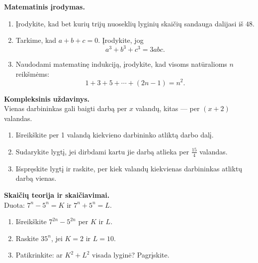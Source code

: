 \begin{exercise}
\textbf{Matematinis įrodymas.}
\begin{enumerate}[label=\arabic*.]
  \item Įrodykite, kad bet kurių trijų nuoseklių lyginių skaičių sandauga
        dalijasi iš $48$.
  \item Tarkime, kad $a + b + c = 0$. Įrodykite, jog
  \[
    a^3 + b^3 + c^3 = 3abc.
  \]
  \item Naudodami matematinę indukciją, įrodykite, kad visoms natūralioms
        $n$ reikšmėms:
  \[
    1 + 3 + 5 + \cdots + (2n-1) = n^2.
  \]
\end{enumerate}
\end{exercise}

\begin{exercise}
\textbf{Kompleksinis uždavinys.}\\
Vienas darbininkas gali baigti darbą per $x$ valandų, kitas — per $(x + 2)$
valandas.
\begin{enumerate}[label=\arabic*.]
  \item Išreikškite per 1 valandą kiekvieno darbininko atliktą darbo dalį.
  \item Sudarykite lygtį, jei dirbdami kartu jie darbą atlieka per $\frac{15}{4}$
        valandas.
  \item Išspręskite lygtį ir raskite, per kiek valandų kiekvienas darbininkas
        atliktų darbą vienas.
\end{enumerate}
\end{exercise}

\begin{exercise}
\textbf{Skaičių teorija ir skaičiavimai.}\\
Duota: $7^n - 5^n = K$ ir $7^n + 5^n = L$.
\begin{enumerate}[label=\arabic*.]
  \item Išreikškite $7^{2n} - 5^{2n}$ per $K$ ir $L$.
  \item Raskite $35^n$, jei $K = 2$ ir $L = 10$.
  \item Patikrinkite: ar $K^2 + L^2$ visada lyginė? Pagrįskite.
\end{enumerate}
\end{exercise}

